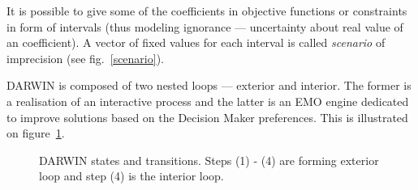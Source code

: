 It is possible to give some of the coefficients in objective functions or
constraints in form of intervals (thus modeling ignorance --- uncertainty
about real value of an coefficient). A vector of fixed values for each
interval is called \textit{scenario} of imprecision (see fig.~\ref{scenario}).

DARWIN is composed of two nested loops --- exterior and interior. The former
is a realisation of an interactive process and the latter is an EMO engine
dedicated to improve solutions based on the Decision Maker preferences. This
is illustrated on figure~\ref{fig:darwin-ext}.

\begin{figure} 
  \begin{center}
    \caption{DARWIN states and transitions. Steps (1) - (4) are forming
      exterior loop and step (4) is the interior loop.\label{fig:darwin-ext}}
  \end{center} 
\end{figure}

